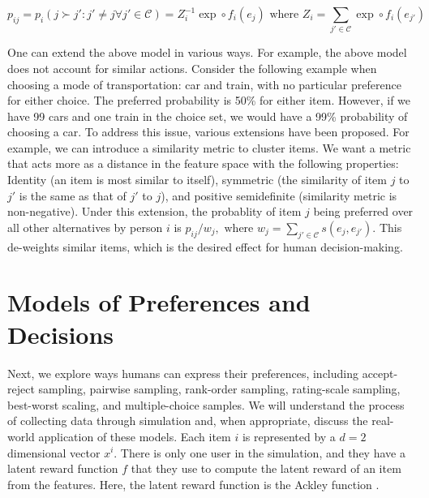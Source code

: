\documentclass[
  letterpaper,
  numbers=noenddot,
  DIV=11]{scrreprt}
\theoremstyle{plain}
\theoremstyle{definition}
\theoremstyle{remark}
\begin{document}
\[
p_{ij} =  p_i(j \succ j': j' \neq j \forall j' \in \mathcal{C}) = Z_i^{-1} \exp \circ f_i(e_j) \text{ where } Z_i = \sum_{j' \in \mathcal{C}} \exp \circ f_i(e_{j'})
\]

One can extend the above model in various ways. For example, the above
model does not account for similar actions. Consider the following
example when choosing a mode of transportation: car and train, with no
particular preference for either choice. The preferred probability is
50\% for either item. However, if we have 99 cars and one train in the
choice set, we would have a 99\% probability of choosing a car. To
address this issue, various extensions have been proposed. For example,
we can introduce a similarity metric to cluster items. We want a metric
that acts more as a distance in the feature space with the following
properties: Identity (an item is most similar to itself), symmetric (the
similarity of item \(j\) to \(j'\) is the same as that of \(j'\) to
\(j\)), and positive semidefinite (similarity metric is non-negative).
Under this extension, the probablity of item \(j\) being preferred over
all other alternatives by person \(i\) is
\(p_{ij} / w_j, \text{ where } w_j = \sum_{j' \in \mathcal{C}} s(e_j, e_{j'})\).
This de-weights similar items, which is the desired effect for human
decision-making.

\section{Models of Preferences and Decisions}\label{preference-model}

Next, we explore ways humans can express their preferences, including
accept-reject sampling, pairwise sampling, rank-order sampling,
rating-scale sampling, best-worst scaling, and multiple-choice samples.
We will understand the process of collecting data through simulation
and, when appropriate, discuss the real-world application of these
models. Each item \(i\) is represented by a \(d=2\) dimensional vector
\(x^i\). There is only one user in the simulation, and they have a
latent reward function \(f\) that they use to compute the latent reward
of an item from the features. Here, the latent reward function is the
Ackley function \cite{ackley1987}.
\end{document}
